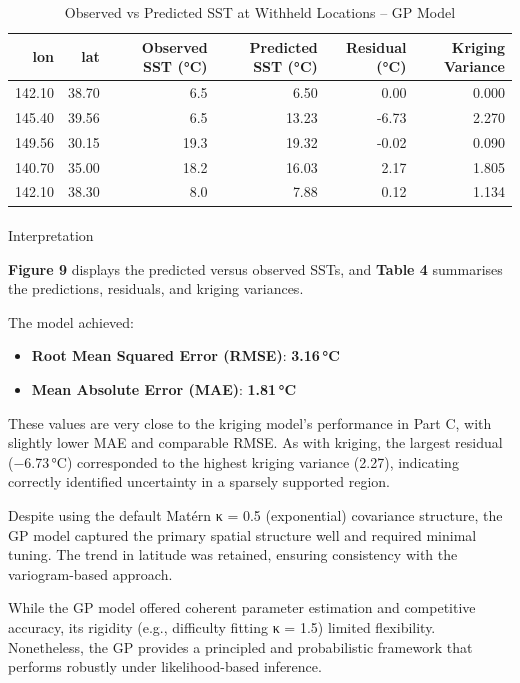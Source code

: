 \documentclass[
  11pt,
]{article}
\makeatletter
\let\oldparagraph\paragraph
\renewcommand{\paragraph}{
    \@ifstar
      \xxxParagraphStar
      \xxxParagraphNoStar
  }
\newcommand{\xxxParagraphStar}[1]{\oldparagraph*{#1}\mbox{}}
\newcommand{\xxxParagraphNoStar}[1]{\oldparagraph{#1}\mbox{}}
\makeatother
\begin{document}
\begin{table}

\caption{Observed vs Predicted SST at Withheld Locations -- GP Model}
\centering
\begin{tabular}[t]{rrrrrr}
\toprule
lon & lat & Observed SST (°C) & Predicted SST (°C) & Residual (°C) & Kriging Variance\\
\midrule
142.10 & 38.70 & 6.5 & 6.50 & 0.00 & 0.000\\
145.40 & 39.56 & 6.5 & 13.23 & -6.73 & 2.270\\
149.56 & 30.15 & 19.3 & 19.32 & -0.02 & 0.090\\
140.70 & 35.00 & 18.2 & 16.03 & 2.17 & 1.805\\
142.10 & 38.30 & 8.0 & 7.88 & 0.12 & 1.134\\
\bottomrule
\end{tabular}
\end{table}

\paragraph{Interpretation}\label{interpretation}

\textbf{Figure 9} displays the predicted versus observed SSTs, and
\textbf{Table 4} summarises the predictions, residuals, and kriging
variances.

The model achieved:

\begin{itemize}
\item
  \textbf{Root Mean Squared Error (RMSE)}: \textbf{3.16\,°C}
\item
  \textbf{Mean Absolute Error (MAE)}: \textbf{1.81\,°C}
\end{itemize}

These values are very close to the kriging model's performance in Part
C, with slightly lower MAE and comparable RMSE. As with kriging, the
largest residual (−6.73\,°C) corresponded to the highest kriging
variance (2.27), indicating correctly identified uncertainty in a
sparsely supported region.

Despite using the default Matérn κ = 0.5 (exponential) covariance
structure, the GP model captured the primary spatial structure well and
required minimal tuning. The trend in latitude was retained, ensuring
consistency with the variogram-based approach.

While the GP model offered coherent parameter estimation and competitive
accuracy, its rigidity (e.g., difficulty fitting κ = 1.5) limited
flexibility. Nonetheless, the GP provides a principled and probabilistic
framework that performs robustly under likelihood-based inference.
\end{document}
